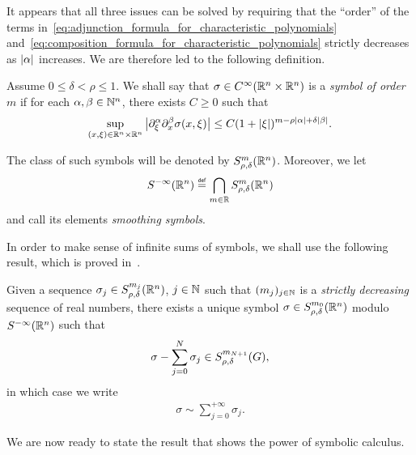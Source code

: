 It appears that all three issues can be solved by requiring
that the ``order'' of the terms in~\eqref{eq:adjunction_formula_for_characteristic_polynomials} and~\eqref{eq:composition_formula_for_characteristic_polynomials} strictly decreases as $\abs \alpha$ increases.
We are therefore led to the following definition.
\begin{definition}
    Assume $0 \leq \delta < \rho \leq 1$.
    We shall say that $\sigma \in \SmoothFunctions {\R^n \times \R^n}$ is a \emph{symbol of order $m$}
    if for each $\alpha, \beta \in \N^n$,
    there exists $C \geq 0$ such that
    \begin{align*}
        \sup_{(x, \xi) \in \R^n \times \R^n} \abs {\iD{\xi^\alpha} \iD{x^\beta}\sigma(x, \xi)} \leq C (1 + \abs \xi)^{m - \rho \abs \alpha + \delta \abs \beta}.
    \end{align*}

    The class of such symbols will be denoted by $\SymbolClass [\R^n] m {\rho, \delta}$.
    Moreover, we let
    \begin{align*}
        \SmoothingSymbols [\R^n] \defeq \bigcap_{m \in \R} \SymbolClass [\R^n] m {\rho, \delta}
    \end{align*}
    and call its elements \emph{smoothing symbols}.
\end{definition}

In order to make sense of infinite sums of symbols,
we shall use the following result,
which is proved in~\cite[Proposition~2.5.33]{RuzhanskyTurunen10}.

\begin{lemma}
    Given a sequence $\sigma_j \in \SymbolClass [\R^n] {m_j} {\rho, \delta}$, $j \in \N$ such that $(m_j)_{j \in \N}$ is a \emph{strictly decreasing} sequence of real numbers,
    there exists a unique symbol $\sigma \in \SymbolClass [\R^n] {m_0} {\rho, \delta}$ modulo $\SmoothingSymbols [\R^n]$ such that
    \begin{align*}
        \sigma - \sum_{j = 0}^N \sigma_j \in \SymbolClass {m_{N + 1}} {\rho, \delta},
    \end{align*}
    in which case we write
    \begin{align*}
        \sigma \sim \sum_{j = 0}^{+\infty} \sigma_j.
    \end{align*}
\end{lemma}

We are now ready to state the result
that shows the power of symbolic calculus.

